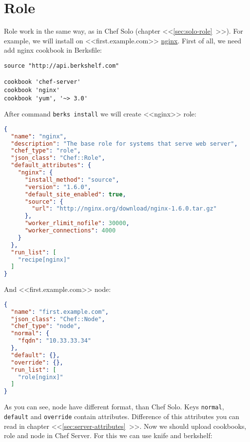 \section{Role}
\label{sec:server-role}

Role work in the same way, as in Chef Solo (chapter <<\ref{sec:solo-role}~>>). For example, we will install on <<first.example.com>> \href{https://supermarket.getchef.com/cookbooks/nginx}{nginx}. First of all, we need add nginx cookbook in Berksfile:

\begin{lstlisting}[label=lst:my-serer-cloud-role1,title=my-server-cloud/Berksfile]
source "http://api.berkshelf.com"

cookbook 'chef-server'
cookbook 'nginx'
cookbook 'yum', '~> 3.0'
\end{lstlisting}

After command \lstinline!berks install! we will create <<nginx>> role:

\begin{lstlisting}[language=JSON,label=lst:my-serer-cloud-role2,title=my-server-cloud/roles/nginx.json]
{
  "name": "nginx",
  "description": "The base role for systems that serve web server",
  "chef_type": "role",
  "json_class": "Chef::Role",
  "default_attributes": {
    "nginx": {
      "install_method": "source",
      "version": "1.6.0",
      "default_site_enabled": true,
      "source": {
        "url": "http://nginx.org/download/nginx-1.6.0.tar.gz"
      },
      "worker_rlimit_nofile": 30000,
      "worker_connections": 4000
    }
  },
  "run_list": [
    "recipe[nginx]"
  ]
}
\end{lstlisting}

And <<first.example.com>> node:

\begin{lstlisting}[language=JSON,label=lst:my-serer-cloud-role3,title=my-server-cloud/nodes/first.example.com.json]
{
  "name": "first.example.com",
  "json_class": "Chef::Node",
  "chef_type": "node",
  "normal": {
    "fqdn": "10.33.33.34"
  },
  "default": {},
  "override": {},
  "run_list": [
    "role[nginx]"
  ]
}
\end{lstlisting}

As you can see, node have different format, than Chef Solo. Keys \lstinline!normal!, \lstinline!default! and \lstinline!override! contain attributes. Difference of this attributes you can read in chapter <<\ref{sec:server-attributes}~>>. Now we should upload cookbooks, role and node in Chef Server. For this we can use knife and berkshelf:

